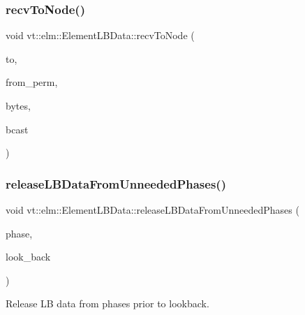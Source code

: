 \subsubsection{\texorpdfstring{recv\+To\+Node()}{recvToNode()}}
{\footnotesize\ttfamily void vt\+::elm\+::\+Element\+L\+B\+Data\+::recv\+To\+Node (\begin{DoxyParamCaption}\item[{\hyperlink{namespacevt_a866da9d0efc19c0a1ce79e9e492f47e2}{Node\+Type}}]{to,  }\item[{\hyperlink{structvt_1_1elm_1_1_element_i_d_struct}{Element\+I\+D\+Struct}}]{from\+\_\+perm,  }\item[{double}]{bytes,  }\item[{bool}]{bcast }\end{DoxyParamCaption})}

\mbox{\label{structvt_1_1elm_1_1_element_l_b_data_ad74e3a2d52dc65533df25846211c9aa4}} 
\subsubsection{\texorpdfstring{release\+L\+B\+Data\+From\+Unneeded\+Phases()}{releaseLBDataFromUnneededPhases()}}
{\footnotesize\ttfamily void vt\+::elm\+::\+Element\+L\+B\+Data\+::release\+L\+B\+Data\+From\+Unneeded\+Phases (\begin{DoxyParamCaption}\item[{\hyperlink{namespacevt_a46ce6733d5cdbd735d561b7b4029f6d7}{Phase\+Type}}]{phase,  }\item[{unsigned int}]{look\+\_\+back }\end{DoxyParamCaption})\hspace{0.3cm}{\ttfamily [protected]}}



Release LB data from phases prior to lookback. 

\mbox{\label{structvt_1_1elm_1_1_element_l_b_data_aa6547718a29385a1600e29ae4b0792dd}} 
